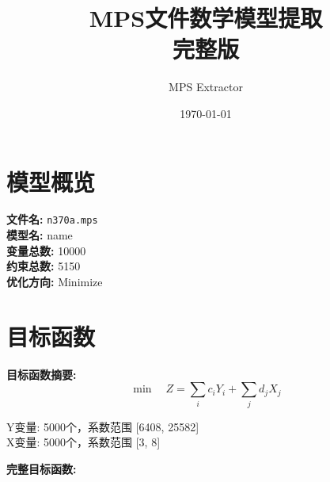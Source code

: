 \documentclass[a4paper,10pt]{article}
\title{MPS文件数学模型提取\\{\large 完整版}}
\author{MPS Extractor}
\date{\today}
\begin{document}
\maketitle
\tableofcontents
\newpage

\section{模型概览}

\textbf{文件名:} \texttt{n370a.mps} \\
\textbf{模型名:} name \\
\textbf{变量总数:} 10000 \\
\textbf{约束总数:} 5150 \\
\textbf{优化方向:} Minimize \\

\section{目标函数}

\textbf{目标函数摘要:}
\begin{equation}
\min \quad Z = \sum_{i} c_i Y_i + \sum_{j} d_j X_j
\end{equation}

Y变量: 5000个，系数范围 [6408, 25582] \\
X变量: 5000个，系数范围 [3, 8]

\textbf{完整目标函数:}
\end{document}
